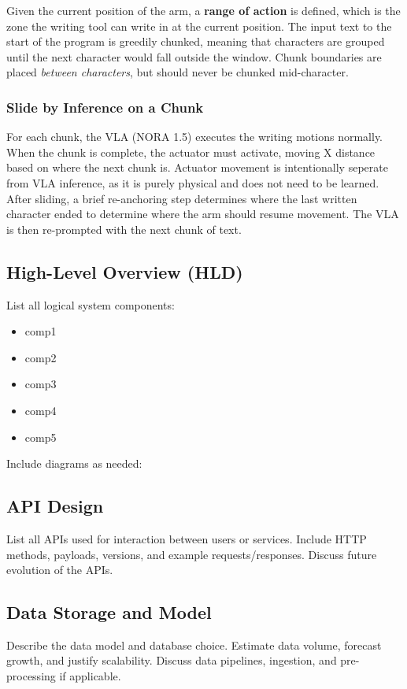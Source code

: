 \documentclass[12pt,a4paper]{article}
\begin{document}
Given the current position of the arm, a \textbf{range of action} is defined, which is the zone the writing tool can write in at the current position. The input text to the start of the program is greedily chunked, meaning that characters are grouped until the next character would fall outside the window. Chunk boundaries are placed \emph{between characters}, but should never be chunked mid-character.

\subsubsection*{Slide by Inference on a Chunk}

For each chunk, the VLA (NORA 1.5) executes the writing motions normally. When the chunk is complete, the actuator must activate, moving X distance based on where the next chunk is. Actuator movement is intentionally seperate from VLA inference, as it is purely physical and does not need to be learned. After sliding, a brief re-anchoring step determines where the last written character ended to determine where the arm should resume movement. The VLA is then re-prompted with the next chunk of text.

\subsection{High-Level Overview (HLD)}
List all logical system components:
\begin{itemize}
  \item comp1
  \item comp2
  \item comp3
  \item comp4
  \item comp5
\end{itemize}

Include diagrams as needed:
\begin{center}
\end{center}

\subsection{API Design}
List all APIs used for interaction between users or services.  
Include HTTP methods, payloads, versions, and example requests/responses.  
Discuss future evolution of the APIs.

\subsection{Data Storage and Model}
Describe the data model and database choice.  
Estimate data volume, forecast growth, and justify scalability.  
Discuss data pipelines, ingestion, and pre-processing if applicable.
\end{document}
